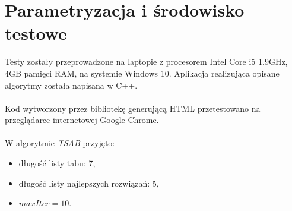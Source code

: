 \documentclass[archivemode]{mgr}
\begin{document}
\section{Parametryzacja i środowisko testowe}
Testy zostały przeprowadzone na laptopie z procesorem Intel Core i5 1.9GHz, 4GB pamięci RAM, na systemie Windows 10. Aplikacja realizująca opisane algorytmy została napisana w C++.\\\\
Kod wytworzony przez bibliotekę generującą HTML przetestowano na przeglądarce internetowej Google Chrome.\\\\
W algorytmie \emph{TSAB} przyjęto:
\begin{itemize}
 	\item długość listy tabu: 7,
 	\item długość listy najlepszych rozwiązań: 5,
 	\item $maxIter = 10$.
\end{itemize}
%
\end{document}
